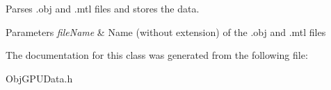 Parses .obj and .mtl files and stores the data. 


\begin{DoxyParams}{Parameters}
{\em file\+Name} & Name (without extension) of the .obj and .mtl files \\
\hline
\end{DoxyParams}


The documentation for this class was generated from the following file\+:\begin{DoxyCompactItemize}
\item 
Obj\+G\+P\+U\+Data.\+h\end{DoxyCompactItemize}
